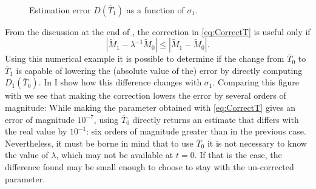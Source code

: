 \documentclass[english, a4paper, 12pt]{article}
\begin{document}
	\begin{figure}[H] 
		\caption{Estimation error $D(\overline{T}_{1})$ as a function of $\sigma_{1}$.}
		\label{fig:CategoryDiff1Plot}
		\,
	\end{figure}
From the discussion at the end of , the correction in \eqref{eq:CorrectT} is useful only if
	$$\left|\tilde{M}_{1} - \lambda^{-1}\tilde{M}_{0} \right|
			\leq \left|\tilde{M}_{1} - \tilde{M}_{0} \right|.$$
Using this numerical example it is possible to determine if the change from $\overline{T}_{0}$ to $\overline{T}_{1}$ is capable of lowering the (absolute value of the) error by directly computing $D_{1}(\overline{T}_{0})$. In  I show how this difference changes with $\sigma_{1}$. Comparing this figure with  we see that making the correction lowers the error by several orders of magnitude: While making the parameter obtained with \eqref{eq:CorrectT} gives an error of magnitude $10^{-7}$, using $\overline{T}_{0}$ directly returns an estimate that differs with the real value by $10^{-1}$: six orders of magnitude greater than in the previous case. Nevertheless, it must be borne in mind that to use $\overline{T}_{0}$ it is not necessary to know the value of $\lambda$, which may not be available at $t = 0$. If that is the case, the difference found may be small enough to choose to stay with the un-corrected parameter.
\end{document}
